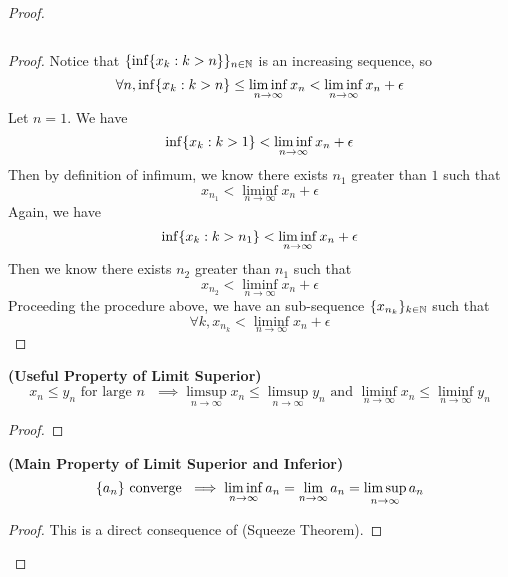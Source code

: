 \documentclass{report}
\begin{document}
\begin{proof}
\begin{theorem}
\begin{equation}
\end{equation}
\end{theorem}
\begin{proof}
Notice that $\{ \inf \{ x_k:k>n \} \}_{n\in\mathbb{N}}$ is an increasing sequence, so
\begin{equation}
\forall n, \inf \{ x_k:k>n \}\leq \liminf_{n\to\infty} x_n<\liminf_{n\to\infty} x_n+\epsilon 
\end{equation}
Let $n=1$. We have
 \begin{equation}
\inf \{ x_k:k>1 \}<\liminf_{n\to\infty}  x_n+\epsilon 
\end{equation}
Then by definition of infimum, we know there exists $n_1$ greater than  $1$ such that
 \begin{equation}
x_{n_1}<\liminf_{n\to\infty} x_n+\epsilon 
\end{equation}
Again, we have
\begin{equation}
\inf \{ x_{k}:k>n_1 \}<\liminf_{n\to\infty} x_n+\epsilon 
\end{equation}
Then we know there exists $n_2$ greater than  $n_1$ such that
 \begin{equation}
x_{n_2}<\liminf_{n\to\infty} x_n+\epsilon 
\end{equation}
Proceeding the procedure above, we have an sub-sequence $\{ x_{n_k} \}_{k\in\mathbb{N}}$ such that
\begin{equation}
\forall k, x_{n_k}<\liminf_{n\to\infty} x_n+\epsilon 
\end{equation}
\end{proof}
\begin{corollary}
\label{4.3.4}
\textbf{(Useful Property of Limit Superior)} 
\begin{equation}
x_n\leq  y_n\text{ for large $n$ }\implies \limsup_{n\to\infty} x_n\leq \limsup_{n\to\infty} y_n\text{ and }\liminf_{n\to\infty}  x_n\leq \liminf_{n\to\infty} y_n
\end{equation}
\end{corollary}
\begin{proof}

\end{proof}
\begin{theorem}
\label{4.3.5}
\textbf{(Main Property of Limit Superior and Inferior)} 
\begin{equation}
\{ a_n \}\text{ converge }\implies \liminf_{n\to\infty} a_n=\lim_{n\to\infty}a_n=\limsup_{n\to\infty} a_n
\end{equation}
\end{theorem}
\begin{proof}
This is a direct consequence of  (Squeeze Theorem). 
\end{proof}
\fbox{\begin{minipage}{39em}


\end{minipage}}
\end{proof}
\end{document}
